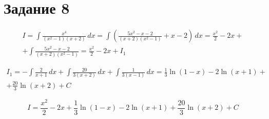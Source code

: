 \section{Задание 8}
\begin{multline*}
    I = \int \frac{x^4}{(x^2-1)(x+2)} \, dx = \int \left(\frac{5 x^2-x-2}{(x+2)
    \left(x^2-1\right)}+x-2\right) \, dx = 
    \frac{x^2}{2} - 2x + \\ + \int \frac{5 x^2-x-2}{(x+2)\left(x^2-1\right)} = 
    \frac{x^2}{2} - 2x + I_1
\end{multline*}

\begin{multline*}
    I_1 = -\int \frac{2}{x+1} \, dx + \int \frac{20}{3 (x+2)} \, dx + \int
    \frac{1}{3 (x-1)} \, dx = \frac{1}{3} \ln (1-x)-2 \ln (x+1) + \\+\frac{20}{3}
    \ln (x+2) + C
\end{multline*}

\[ I = \frac{x^2}{2} - 2x + \frac{1}{3} \ln (1-x)-2 \ln (x+1) + 
\frac{20}{3} \ln (x+2) + C \]


